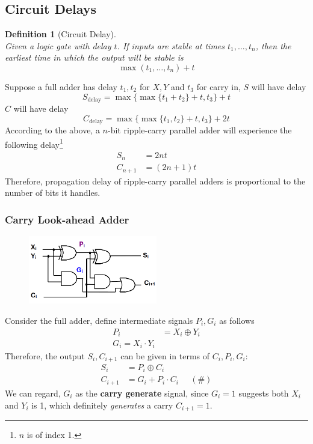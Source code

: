 \documentclass[12pt]{article}
\newtheorem{definition}{Definition}[section]
\theoremstyle{definition}
\begin{document}
\subsection{Circuit Delays}
\begin{definition}[Circuit Delay]
\hfill\\\normalfont Given a logic gate with delay $t$. If inputs are stable at times $t_1,\ldots, t_n$, then the earliest time in which the output will be stable is
\[
\max(t_1,\ldots, t_n)+t
\]
\end{definition}
Suppose a full adder has delay $t_1,t_2$ for $X,Y$ and $t_3$ for carry in, $S$ will have delay \[ S_\text{delay} = \max\{\max\{t_1+t_2\}+t,t_3 \}+t\]
$C$ will have delay \[
C_\text{delay} = \max\{\max\{t_1,t_2\}+t,t_3\}+2t
\] 
According to the above, a $n$-bit ripple-carry parallel adder will experience the following delay\footnote{$n$ is of index 1.}
\begin{align*}
S_n &= 2nt\\
C_{n+1}&=(2n+1)t
\end{align*}
Therefore, propagation delay of ripple-carry parallel adders is proportional to the number of bits it handles.
\subsubsection{Carry Look-ahead Adder}
\begin{figure}[h]
\centering
\includegraphics[width = 0.5\textwidth]{6_12.png}
\end{figure}
Consider the full adder, define intermediate signals $P_i,G_i$ as follows
\begin{align*}
P_i&=X_i\oplus Y_i\\
G_i = X_i\cdot Y_i
\end{align*}
Therefore, the output $S_i, C_{i+1}$ can be given in terms of $C_i,P_i,G_i$:
\begin{align*}
S_i &= P_i\oplus C_i\\
C_{i+1}&=G_i+P_i\cdot C_i\;\;\;\;\;(\#)
\end{align*}
We can regard, $G_i$ as the \textbf{carry generate} signal, since $G_i = 1$ suggests both $X_i$ and $Y_i$ is 1, which definitely \textit{generates} a carry $C_{i+1}=1$.\\
\end{document}
